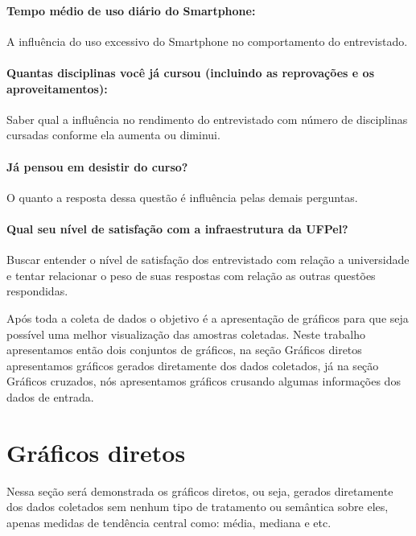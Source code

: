 \documentclass[11pt]{scrartcl} %
\begin{document}
\paragraph{\textbf{Tempo médio de uso diário do Smartphone:}} A influência do uso excessivo do Smartphone no comportamento do entrevistado.

\paragraph{\textbf{Quantas disciplinas você já cursou (incluindo as reprovações e os aproveitamentos):}} Saber qual a influência no rendimento do entrevistado com número de disciplinas cursadas conforme ela aumenta ou diminui.

\paragraph{\textbf{Já pensou em desistir do curso?}} O quanto a resposta dessa questão é influência pelas demais perguntas.  

\paragraph{\textbf{Qual seu nível de satisfação com a infraestrutura da UFPel?}} Buscar entender o nível de satisfação dos entrevistado com relação a universidade e tentar relacionar o peso de suas respostas com  relação as outras questões respondidas.

Após toda a coleta de dados o objetivo é a apresentação de gráficos para que seja possível uma melhor visualização das amostras coletadas. Neste trabalho apresentamos então dois conjuntos de gráficos, na seção Gráficos diretos apresentamos gráficos gerados diretamente dos dados coletados,
já na seção Gráficos cruzados, nós apresentamos gráficos crusando algumas informações dos dados de entrada.

\clearpage


\section{Gráficos diretos}

Nessa seção será demonstrada os gráficos diretos, ou seja, gerados diretamente dos dados coletados sem nenhum tipo de tratamento ou semântica sobre eles, apenas medidas de tendência central como: média, mediana e etc.
\end{document}
